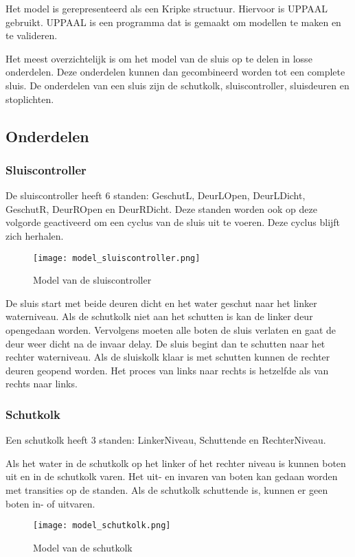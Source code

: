 \documentclass[../verslag.tex]{subfiles}
\begin{document}
Het model is gerepresenteerd als een Kripke structuur. Hiervoor is UPPAAL gebruikt. UPPAAL is een programma dat is gemaakt om modellen te maken en te valideren.

Het meest overzichtelijk is om het model van de sluis op te delen in losse onderdelen. Deze onderdelen kunnen dan gecombineerd worden tot een complete sluis. De onderdelen van een sluis zijn de schutkolk, sluiscontroller, sluisdeuren en stoplichten.




\subsection{Onderdelen} 

\subsubsection{Sluiscontroller}
De sluiscontroller heeft 6 standen: GeschutL, DeurLOpen, DeurLDicht, GeschutR, DeurROpen en DeurRDicht.
Deze standen worden ook op deze volgorde geactiveerd om een cyclus van de sluis uit te voeren. Deze cyclus blijft zich herhalen.
\begin{figure}[H]
    \centering
    \texttt{[image: model\_sluiscontroller.png]}
    \caption{Model van de sluiscontroller}
\end{figure}

De sluis start met beide deuren dicht en het water geschut naar het linker waterniveau. Als de schutkolk niet aan het schutten is kan de linker deur opengedaan worden. Vervolgens moeten alle boten de sluis verlaten en gaat de deur weer dicht na de invaar delay. De sluis begint dan te schutten naar het rechter waterniveau. Als de sluiskolk klaar is met schutten kunnen de rechter deuren geopend worden. Het proces van links naar rechts is hetzelfde als van rechts naar links.




\subsubsection{Schutkolk}
Een schutkolk heeft 3 standen: LinkerNiveau, Schuttende en RechterNiveau.

Als het water in de schutkolk op het linker of het rechter niveau is kunnen boten uit en in de schutkolk varen. Het uit- en invaren van boten kan gedaan worden met transities op de standen.
Als de schutkolk schuttende is, kunnen er geen boten in- of uitvaren.
\begin{figure}[H]
    \centering
    \texttt{[image: model\_schutkolk.png]}
    \caption{Model van de schutkolk}
\end{figure}
\end{document}
